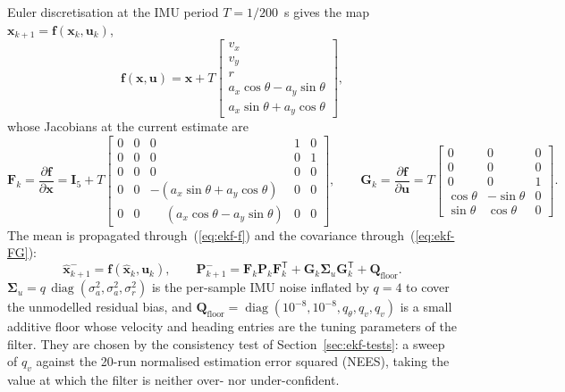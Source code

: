 \documentclass[11pt,a4paper]{article}
\newcommand{\vect}[1]{\bm{#1}}
\newcommand{\mat}[1]{\bm{#1}}
\newcommand{\T}{^{\mathsf{T}}}
\newcommand{\diag}{\operatorname{diag}}
\newcommand{\hx}{\hat{\vect x}}
\begin{document}
Euler discretisation at the IMU period $T = 1/200$~s gives the map $\vect x_{k+1} = \vect f(\vect x_k, \vect u_k)$,
\begin{equation}
\vect f(\vect x,\vect u) = \vect x + T\begin{bmatrix} v_x\\ v_y\\ r\\ a_x\cos\theta - a_y\sin\theta\\ a_x\sin\theta + a_y\cos\theta\end{bmatrix},
\label{eq:ekf-f}
\end{equation}
whose Jacobians at the current estimate are
\begin{equation}
\mat F_k = \frac{\partial\vect f}{\partial\vect x} = \mat I_5 + T\begin{bmatrix}
0&0&0&1&0\\ 0&0&0&0&1\\ 0&0&0&0&0\\
0&0&-(a_x\sin\theta + a_y\cos\theta)&0&0\\
0&0&\phantom{-}(a_x\cos\theta - a_y\sin\theta)&0&0\end{bmatrix},\qquad
\mat G_k = \frac{\partial\vect f}{\partial\vect u} = T\begin{bmatrix}
0&0&0\\ 0&0&0\\ 0&0&1\\ \cos\theta&-\sin\theta&0\\ \sin\theta&\cos\theta&0\end{bmatrix}.
\label{eq:ekf-FG}
\end{equation}
The mean is propagated through~(\ref{eq:ekf-f}) and the covariance through~(\ref{eq:ekf-FG}):
\begin{equation}
\hx_{k+1}^- = \vect f(\hx_k, \vect u_k),\qquad
\mat P_{k+1}^- = \mat F_k\mat P_k\mat F_k\T + \mat G_k\mat\Sigma_u\mat G_k\T + \mat Q_{\mathrm{floor}} .
\label{eq:ekf-pred}
\end{equation}
$\mat\Sigma_u = q\,\diag(\sigma_a^2,\sigma_a^2,\sigma_r^2)$ is the per-sample IMU noise inflated by $q=4$ to cover the unmodelled residual bias, and $\mat Q_{\mathrm{floor}} = \diag(10^{-8},10^{-8},q_\theta,q_v,q_v)$ is a small additive floor whose velocity and heading entries are the tuning parameters of the filter. They are chosen by the consistency test of Section~\ref{sec:ekf-tests}: a sweep of $q_v$ against the 20-run normalised estimation error squared (NEES), taking the value at which the filter is neither over- nor under-confident.
\end{document}
